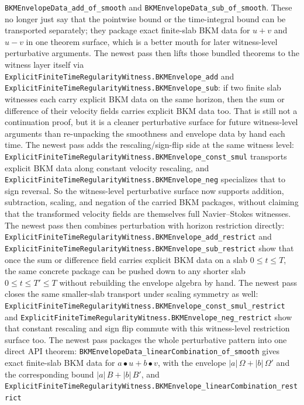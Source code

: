 \documentclass[11pt]{article}
\begin{document}
\texttt{BKMEnvelopeData\_add\_of\_smooth} and
\texttt{BKMEnvelopeData\_sub\_of\_smooth}.  These no longer just say that the
pointwise bound or the time-integral bound can be transported separately; they
package exact finite-slab BKM data for \(u+v\) and \(u-v\) in one theorem
surface, which is a better mouth for later witness-level perturbative
arguments.  The newest pass then lifts those bundled theorems to the witness
layer itself via
\texttt{ExplicitFiniteTimeRegularityWitness.BKMEnvelope\_add} and
\texttt{ExplicitFiniteTimeRegularityWitness.BKMEnvelope\_sub}: if two finite
slab witnesses each carry explicit BKM data on the same horizon, then the sum
or difference of their velocity fields carries explicit BKM data too.  That is
still not a continuation proof, but it is a cleaner perturbative surface for
future witness-level arguments than re-unpacking the smoothness and envelope
data by hand each time.  The newest pass adds the rescaling/sign-flip side at
the same witness level:
\texttt{ExplicitFiniteTimeRegularityWitness.BKMEnvelope\_const\_smul} transports
explicit BKM data along constant velocity rescaling, and
\texttt{ExplicitFiniteTimeRegularityWitness.BKMEnvelope\_neg} specializes that
to sign reversal.  So the witness-level perturbative surface now supports
addition, subtraction, scaling, and negation of the carried BKM packages,
without claiming that the transformed velocity fields are themselves full
Navier--Stokes witnesses.  The newest pass then combines perturbation with
horizon restriction directly:
\texttt{ExplicitFiniteTimeRegularityWitness.BKMEnvelope\_add\_restrict} and
\texttt{ExplicitFiniteTimeRegularityWitness.BKMEnvelope\_sub\_restrict} show
that once the sum or difference field carries explicit BKM data on a slab
\(0 \le t \le T\), the same concrete package can be pushed down to any shorter
slab \(0 \le t \le T' \le T\) without rebuilding the envelope algebra by hand.
The newest pass closes the same smaller-slab transport under scaling symmetry
as well:
\texttt{ExplicitFiniteTimeRegularityWitness.BKMEnvelope\_const\_smul\_restrict}
and \texttt{ExplicitFiniteTimeRegularityWitness.BKMEnvelope\_neg\_restrict}
show that constant rescaling and sign flip commute with this witness-level
restriction surface too.  The newest pass packages the whole perturbative
pattern into one direct API theorem:
\texttt{BKMEnvelopeData\_linearCombination\_of\_smooth} gives exact finite-slab
BKM data for \(a \bullet u + b \bullet v\), with the envelope
\(|a|\,\Omega + |b|\,\Omega'\) and the corresponding bound
\(|a|\,B + |b|\,B'\), and
\texttt{ExplicitFiniteTimeRegularityWitness.BKMEnvelope\_linearCombination\_restrict}
\end{document}

